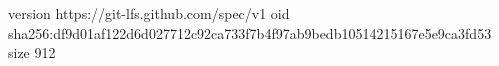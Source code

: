 version https://git-lfs.github.com/spec/v1
oid sha256:df9d01af122d6d027712c92ca733f7b4f97ab9bedb10514215167e5e9ca3fd53
size 912
